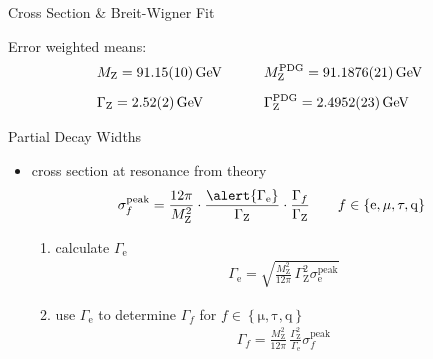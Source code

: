 \documentclass[11pt,xcolor=dvipsnames,professionalfonts]{beamer}
\begin{document}
\begin{frame}{Cross Section \& Breit-Wigner Fit}
	\begin{center}
		
	\end{center}
	\vfill
	\pause
	Error weighted means:
	\begin{alignat*}{2}
		&M_\mathrm{Z} = \SI{91.15 +- 0.1}{GeV} \qquad &&M_\mathrm{Z}^\mathrm{PDG} = \SI{91.1876 +- 0.0021}{GeV}\\[0.5em]
		&\Gamma_\mathrm{Z} = \SI{2.52 +- 0.02}{GeV} \qquad &&\Gamma_\mathrm{Z}^\mathrm{PDG} = \SI{2.4952 +- 0.0023}{GeV}
	\end{alignat*}
\end{frame}

\begin{frame}{Partial Decay Widths}
	\begin{itemize}
		\item cross section at resonance from theory
			\begin{align*}
			\sigma_f^\mathrm{peak} = \frac{12 \pi}{M_\mathrm{Z}^2} \cdot \frac{\alert{\Gamma_\mathrm{e}}}{\Gamma_\mathrm{Z}} \cdot \frac{\Gamma_f}{\Gamma_\mathrm{Z}} \qquad f \in \left\{ \mathrm{e}, \mathrm{\mu}, \mathrm{\tau}, \mathrm{q} \right\}
			\end{align*}
		
		\begin{enumerate}
			\item<2-> calculate $\Gamma_\mathrm{e}$
				 \begin{align*}
				 	\Gamma_\mathrm{e} = \sqrt{\frac{M_\mathrm{Z}^2}{12 \pi} \, \Gamma_\mathrm{Z}^2 \sigma_\mathrm{e}^\mathrm{peak}}
				 \end{align*}
				 
			\item<3-> use $\Gamma_\mathrm{e}$ to determine $\Gamma_f$ for $f \in \left\{ \mathrm{\mu}, \mathrm{\tau}, \mathrm{q} \right\}$
				\begin{align*}
					\Gamma_f = \frac{M_\mathrm{Z}^2}{12 \pi } \, \frac{\Gamma_\mathrm{Z}^2 }{\Gamma_\mathrm{e}} \sigma_f^\mathrm{peak}
				\end{align*}
		\end{enumerate}
	\end{itemize}	
\end{frame}
\end{document}
